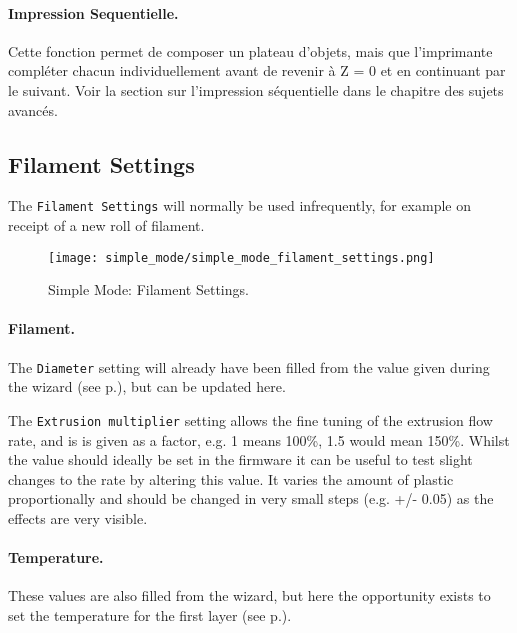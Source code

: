 
\paragraph{Impression Sequentielle.} %
\label{par:sequential_printing}
Cette fonction permet de composer un plateau d'objets, mais que l'imprimante compléter chacun individuellement avant de revenir à Z = 0 et en continuant par le suivant. Voir la section sur l'impression séquentielle dans le chapitre des sujets avancés.


\subsection{Filament Settings}

The \texttt{Filament Settings} will normally be used infrequently, for example on receipt of a new roll of filament.

\begin{figure}[H]
\centering
\texttt{[image: simple\_mode/simple\_mode\_filament\_settings.png]}
\caption{Simple Mode: Filament Settings.}
\label{fig:simple_mode_filament_settings}
\end{figure}

\paragraph{Filament.} %
\label{par:filament}
The \texttt{Diameter} setting will already have been filled from the value given during the wizard (see p.\pageref{sub:4_filament_diameter}), but can be updated here.

The \texttt{Extrusion multiplier} setting allows the fine tuning of the extrusion flow rate, and is is given as a factor, e.g. 1 means 100\%, 1.5 would mean 150\%.  Whilst the value should ideally be set in the firmware it can be useful to test slight changes to the rate by altering this value.  It varies the amount of plastic proportionally and should be changed in very small steps (e.g. +/- 0.05) as the effects are very visible.

\paragraph{Temperature.} %
\label{par:temperature}
These values are also filled from the wizard, but here the opportunity exists to set the temperature for the first layer (see p.\pageref{sec:the_important_first_layer}).


